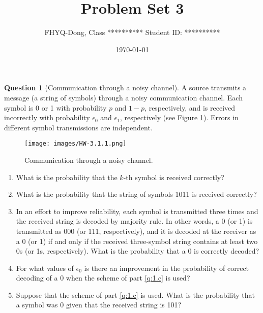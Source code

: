 \documentclass[utf8]{article}
\title{Problem Set 3}
\author{ FHYQ-Dong, Class ********** Student ID: ********** }
\date{\today}
\theoremstyle{definition}%
\newtheorem{question}{Question} %
\theoremstyle{plain}%
\begin{document}
\maketitle
\thispagestyle{fancy}

\begin{question}[Communication through a noisy channel]
    A source transmits a message (a string of symbols) through a noisy communication channel. Each symbol is 0 or 1 with probability $p$ and $1-p$, respectively, and is received incorrectly with probability $\epsilon_0$ and $\epsilon_1$, respectively (see Figure \ref{fig:3.1.1}). Errors in different symbol transmissions are independent.
    \begin{figure}[H]
        \centering
        \texttt{[image: images/HW-3.1.1.png]}
        \caption{Communication through a noisy channel.}
        \label{fig:3.1.1}
    \end{figure}
    \begin{enumerate}[label=(\alph*)]
        \item What is the probability that the $k$-th symbol is received correctly?
        \item What is the probability that the string of symbols 1011 is received correctly?
        \item \label{q:1.c} In an effort to improve reliability, each symbol is transmitted three times and the received string is decoded by majority rule. In other words, a 0 (or 1) is transmitted as 000 (or 111, respectively), and it is decoded at the receiver as a 0 (or 1) if and only if the received three-symbol string contains at least two 0s (or 1s, respectively). What is the probability that a 0 is correctly decoded?
        \item For what values of $\epsilon_0$ is there an improvement in the probability of correct decoding of a 0 when the scheme of part \ref{q:1.c} is used?
        \item Suppose that the scheme of part \ref{q:1.c} is used. What is the probability that a symbol was 0 given that the received string is 101?
    \end{enumerate}
\end{question}
\end{document}

